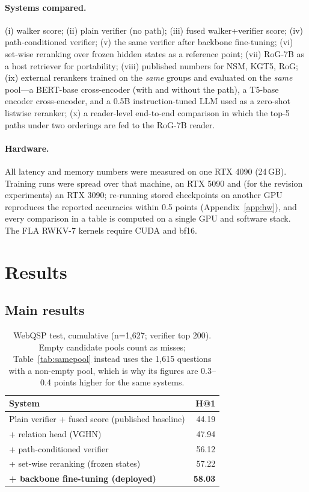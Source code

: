 \documentclass[sigconf,review]{acmart}
\begin{document}
\paragraph{Systems compared.}
(i) walker score; (ii) plain verifier (no path); (iii) fused walker+verifier score; (iv) path-conditioned verifier; (v) the same verifier after backbone fine-tuning; (vi) set-wise reranking over frozen hidden states as a reference point; (vii) RoG-7B as a host retriever for portability; (viii) published numbers for NSM, KGT5, RoG; (ix) external rerankers trained on the \emph{same} groups and evaluated on the \emph{same} pool---a BERT-base cross-encoder (with and without the path), a T5-base encoder cross-encoder, and a 0.5B instruction-tuned LLM used as a zero-shot listwise reranker; (x) a reader-level end-to-end comparison in which the top-5 paths under two orderings are fed to the RoG-7B reader.

\paragraph{Hardware.}
All latency and memory numbers were measured on one RTX 4090 (24\,GB). Training runs were spread over that machine, an RTX 5090 and (for the revision experiments) an RTX 3090; re-running stored checkpoints on another GPU reproduces the reported accuracies within 0.5 points (Appendix~\ref{app:hw}), and every comparison in a table is computed on a single GPU and software stack. The FLA RWKV-7 kernels require CUDA and bf16.

\section{Results}
\label{sec:results}

\subsection{Main results}
\label{sec:main}

\begin{table}[t]
\centering\small
\caption{WebQSP test, cumulative (n=1,627; verifier top 200). Empty candidate pools count as misses; Table~\ref{tab:samepool} instead uses the 1,615 questions with a non-empty pool, which is why its figures are 0.3--0.4 points higher for the same systems.}
\label{tab:main}
\begin{tabular}{lr}
\toprule
System & H@1 \\
\midrule
Plain verifier + fused score (published baseline) & 44.19 \\
\quad + relation head (VGHN) & 47.94 \\
\quad + path-conditioned verifier & 56.12 \\
\quad + set-wise reranking (frozen states) & 57.22 \\
\quad \textbf{+ backbone fine-tuning (deployed)} & \textbf{58.03} \\
\bottomrule
\end{tabular}
\end{table}
\end{document}
